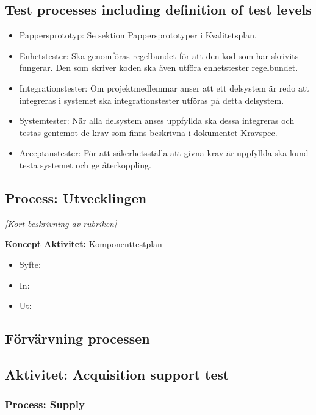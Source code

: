 \documentclass[a4paper,10pt]{article}
\begin{document}
\subsection{Test processes including definition of test levels}
\begin{itemize}
	\item Pappersprototyp: Se sektion Pappersprototyper i Kvalitetsplan.
	\item Enhetstester: Ska genomföras regelbundet för att den kod som har skrivits fungerar. Den som skriver koden ska även utföra enhetstester regelbundet.
	\item Integrationstester: Om projektmedlemmar anser att ett delsystem är redo att integreras i systemet ska integrationstester utföras på detta delsystem.
	\item Systemtester: När alla delsystem anses uppfyllda ska dessa integreras och testas gentemot de krav som finns beskrivna i dokumentet Kravspec.
	\item Acceptanstester: För att säkerhetsställa att givna krav är uppfyllda ska kund testa systemet och ge återkoppling.
\end{itemize}

\subsection{Process: Utvecklingen}
\emph{[Kort beskrivning av rubriken]}

\textbf{Koncept Aktivitet:} Komponenttestplan
\begin{itemize}
    \item Syfte:
    \item In:
    \item Ut:
\end{itemize}
\subsection{Förvärvning processen}
\subsection{Aktivitet: Acquisition support test}
\subsubsection{Process: Supply}


\end{document}
